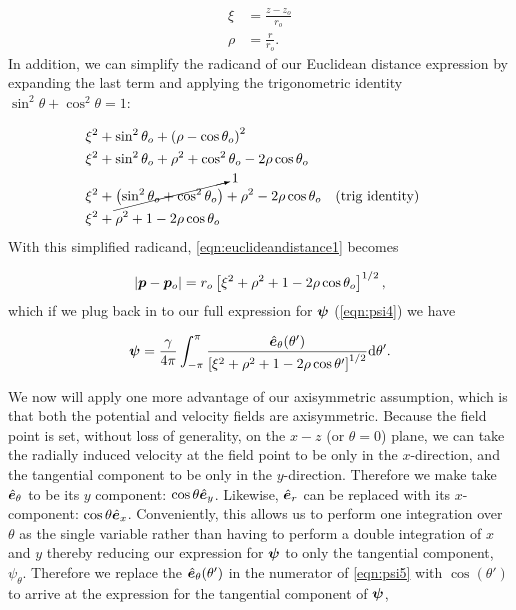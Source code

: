 \begin{align}
    \xi &= \frac{z - z_o}{r_o} \\
    \rho &= \frac{r}{r_o}.
\end{align}
%
In addition, we can simplify the radicand of our Euclidean distance expression by expanding the last term and applying the trigonometric identity \(\sin^2\theta + \cos^2\theta =1\):

\begin{equation}
    \begin{aligned}
        \xi^2  &+ \sin^2\theta_o + \left(\rho-\cos\theta_o\right)^2 \\
        \xi^2  &+ \sin^2\theta_o + \rho^2+\cos^2\theta_o-2\rho\cos\theta_o \\
        \xi^2  &+ \cancelto{1}{\left(\sin^2\theta_o + \cos^2\theta_o\right)} + \rho^2-2\rho\cos\theta_o && (\text{trig identity}) \\
        \xi^2  &+ \rho^2 + 1 -2\rho\cos\theta_o \\
    \end{aligned}
\end{equation}
%
With this simplified radicand, \cref{eqn:euclideandistance1} becomes

\begin{equation}
    \label{eqn:euclideandistance2}
    |\bm{p}-\bm{p}_o| = r_o \left[ \xi^2  + \rho^2 + 1 -2\rho\cos\theta_o \right]^{1/2},
\end{equation}
%
which if we plug back in to our full expression for \(\bm{\psi}\) (\cref{eqn:psi4}) we have

\begin{equation}
    \label{eqn:psi5}
    \bm{\psi} = \frac{\gamma}{4\pi} \int_{-\pi}^{\pi} \frac{ \hat{\bm{e}}_\theta(\theta')}{\left[ \xi^2  + \rho^2 + 1 -2\rho\cos\theta' \right]^{1/2}} \mathrm{d}\theta'.
\end{equation}

We now will apply one more advantage of our axisymmetric assumption, which is that both the potential and velocity fields are axisymmetric.
%
Because the field point is set, without loss of generality, on the \(x-z\) (or \(\theta=0\)) plane, we can take the radially induced velocity at the field point to be only in the \(x\)-direction, and the tangential component to be only in the \(y\)-direction.
%
Therefore we make take \(\hat{\bm{e}}_\theta\) to be its \(y\) component: \(\cos\theta\hat{\bm{e}}_y\).
%
Likewise, \(\hat{\bm{e}}_r\) can be replaced with its \(x\)-component: \(\cos\theta\hat{\bm{e}}_x\).
%
Conveniently, this allows us to perform one integration over \(\theta\) as the single variable rather than having to perform a double integration of \(x\) and \(y\) thereby reducing our expression for \(\bm{\psi}\) to only the tangential component, \(\psi_\theta\).
%
Therefore we replace the \(\hat{\bm{e}}_\theta(\theta')\) in the numerator of \cref{eqn:psi5} with \(\cos(\theta')\) to arrive at the expression for the tangential component of \(\bm{\psi}\),

